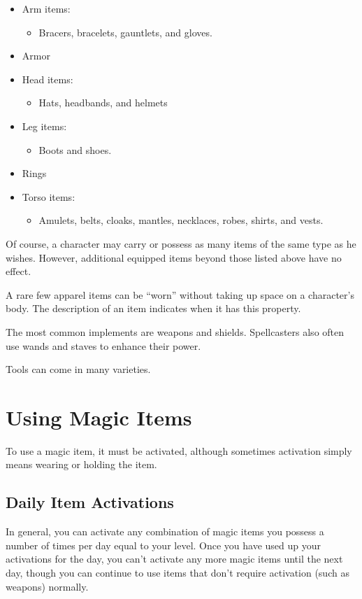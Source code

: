 \begin{itemize}
    \item Arm items:
        \begin{itemize}
            \item Bracers, bracelets, gauntlets, and gloves.
        \end{itemize}
    \item Armor
    \item Head items:
        \begin{itemize}
            \item Hats, headbands, and helmets
        \end{itemize}
    \item Leg items:
        \begin{itemize}
            \item Boots and shoes.
        \end{itemize}
    \item Rings
    \item Torso items:
        \begin{itemize}
            \item Amulets, belts, cloaks, mantles, necklaces, robes, shirts, and vests.
        \end{itemize}
\end{itemize}

Of course, a character may carry or possess as many items of the same type as he wishes.
However, additional equipped items beyond those listed above have no effect.

A rare few apparel items can be ``worn'' without taking up space on a character's body.
The description of an item indicates when it has this property.

 The most common implements are weapons and shields.
Spellcasters also often use wands and staves to enhance their power.

 Tools can come in many varieties.

\section{Using Magic Items}

To use a magic item, it must be activated, although sometimes activation simply means wearing or holding the item.

\subsection{Daily Item Activations}
In general, you can activate any combination of magic items you possess a number of times per day equal to your level.
Once you have used up your activations for the day, you can't activate any more magic items until the next day, though you can continue to use items that don't require activation (such as weapons) normally.

